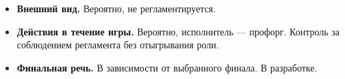 
\begin{itemize}
\item \textbf{Внешний вид.} Вероятно, не регламентируется.

\item \textbf{Действия в течение игры.} Вероятно, исполнитель --- профорг. Контроль за соблюдением регламента без отыгрывания роли.

\item \textbf{Финальная речь.} В зависимости от выбранного финала. В разработке.
\end{itemize}